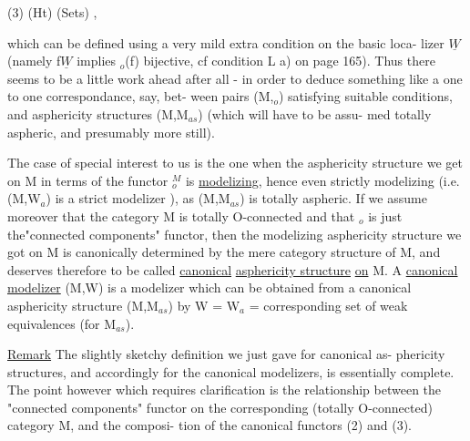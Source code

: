 
(3) \qquad (Ht)  (Sets) ,

which can be defined using a very mild extra condition on the basic loca-%
lizer $\underline{W}$ (namely f\hand{$\in$}$\underline{W}$ implies \hand{$\pi$}$_{o}$(f) bijective, cf condition L a) on
page 165). Thus there seems to be a little work ahead after all -
in order to deduce something like a one to one correspondance, say, bet-%
ween  pairs (M,\hand{$\pi$}$_{o}$) satisfying suitable conditions, and
 asphericity structures  (M,M$_{as}$)
 (which will have to be assu-%
med totally aspheric, and presumably  more still).

The case of special interest to us is the one when the asphericity
structure we get on M in terms of the functor \hand{$\pi$}$^{M}_{o}$ is \uline{modelizing}, hence
even strictly modelizing (i.e. (M,W$_{a}$) is a strict modelizer ), as
(M,M$_{as}$) is totally aspheric. If we assume moreover that 
the category M is totally O-connected and that \hand{$\pi$}$_{o}$ is just the"connected
components" functor, then the modelizing asphericity structure we got
on M is canonically determined by the mere category structure of M,
and deserves therefore to be called  \uline{canonical}  \uline{asphericity structure}
\uline{on} M. A \uline{canonical} \uline{modelizer} (M,W) is a modelizer which can be obtained
from a canonical asphericity structure (M,M$_{as}$) by W = W$_{a}$ = corresponding
set of weak equivalences (for M$_{as}$).

\uline{Remark} The slightly sketchy definition we just gave for  canonical  as-%
phericity structures, and accordingly for the canonical modelizers, is
essentially complete. The point however which requires clarification is
the relationship between the  "connected components" functor
on the corresponding (totally O-connected) category M, and the composi-%
tion of the canonical functors (2) and (3).

